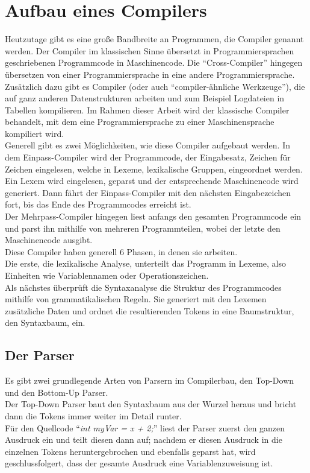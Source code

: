 \section{Aufbau eines Compilers}

Heutzutage gibt es eine große Bandbreite an Programmen, die Compiler genannt werden.
Der Compiler im klassischen Sinne übersetzt in Programmiersprachen geschriebenen Programmcode in Maschinencode.
Die ``Cross-Compiler'' hingegen übersetzen von einer Programmiersprache in eine andere Programmiersprache.
Zusätzlich dazu gibt es Compiler (oder auch ``compiler-ähnliche Werkzeuge''), die auf ganz anderen Datenstrukturen arbeiten und zum Beispiel Logdateien in Tabellen kompilieren.
Im Rahmen dieser Arbeit wird der klassische Compiler behandelt, mit dem eine Programmiersprache zu einer Maschinensprache kompiliert wird.\\
Generell gibt es zwei Möglichkeiten, wie diese Compiler aufgebaut werden.
In dem Einpass-Compiler wird der Programmcode, der Eingabesatz, Zeichen für Zeichen eingelesen, welche in Lexeme, lexikalische Gruppen, eingeordnet werden.
Ein Lexem wird eingelesen, geparst und der entsprechende Maschinencode wird generiert.
Dann fährt der Einpass-Compiler mit den nächsten Eingabezeichen fort, bis das Ende des Programmcodes erreicht ist.\\
Der Mehrpass-Compiler hingegen liest anfangs den gesamten Programmcode ein und parst ihn mithilfe von mehreren Programmteilen, wobei der letzte den Maschinencode ausgibt\cite{mossenbock:2024}.\\
Diese Compiler haben generell 6 Phasen, in denen sie arbeiten.\\
Die erste, die lexikalische Analyse, unterteilt das Programm in Lexeme, also Einheiten wie Variablennamen oder Operationszeichen.\\
Als nächstes überprüft die Syntaxanalyse die Struktur des Programmcodes mithilfe von grammatikalischen Regeln.
Sie generiert mit den Lexemen zusätzliche Daten und ordnet die resultierenden Tokens in eine Baumstruktur, den Syntaxbaum, ein.\\

\subsection{Der Parser}

Es gibt zwei grundlegende Arten von Parsern im Compilerbau, den Top-Down und den Bottom-Up Parser.\\
Der Top-Down Parser baut den Syntaxbaum aus der Wurzel heraus und bricht dann die Tokens immer weiter im Detail runter.\\
Für den Quellcode ``\textit{int myVar = x + 2;}'' liest der Parser zuerst den ganzen Ausdruck ein und teilt diesen dann auf;
nachdem er diesen Ausdruck in die einzelnen Tokens heruntergebrochen und ebenfalls geparst hat, wird geschlussfolgert, dass der gesamte Ausdruck eine Variablenzuweisung ist.

